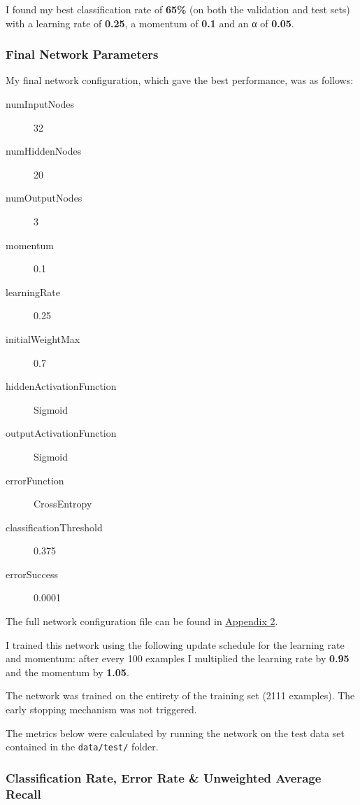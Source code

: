 \documentclass[a4paper]{article}
\begin{document}
I found my best classification rate of \textbf{65\%} (on both the validation and test sets) with a learning rate of \textbf{0.25}, a momentum of \textbf{0.1} and an α of \textbf{0.05}.

\newpage
\subsubsection{Final Network Parameters}%
\label{subsubsec:ev_cp_networkparameters}

My final network configuration, which gave the best performance, was as follows:

\begin{description}
\item[numInputNodes] 32
\item[numHiddenNodes] 20
\item[numOutputNodes] 3
\item[momentum] 0.1
\item[learningRate] 0.25
\item[initialWeightMax] 0.7
\item[hiddenActivationFunction] Sigmoid
\item[outputActivationFunction] Sigmoid
\item[errorFunction] CrossEntropy
\item[classificationThreshold] 0.375
\item[errorSuccess] 0.0001
\end{description}

The full network configuration file can be found in \hyperref[subsec:a2_finalconfig]{Appendix 2}.

I trained this network using the following update schedule for the learning rate and momentum: after every 100 examples I multiplied the learning rate by \textbf{0.95} and the momentum by \textbf{1.05}.

The network was trained on the entirety of the training set (2111 examples). The early stopping mechanism was not triggered.

The metrics below were calculated by running the network on the test data set contained in the \lstinline{data/test/} folder.

\newpage
\subsubsection{Classification Rate, Error Rate \& Unweighted Average Recall}
\label{subsubsec:ev_cp_classificationrate}
\end{document}
